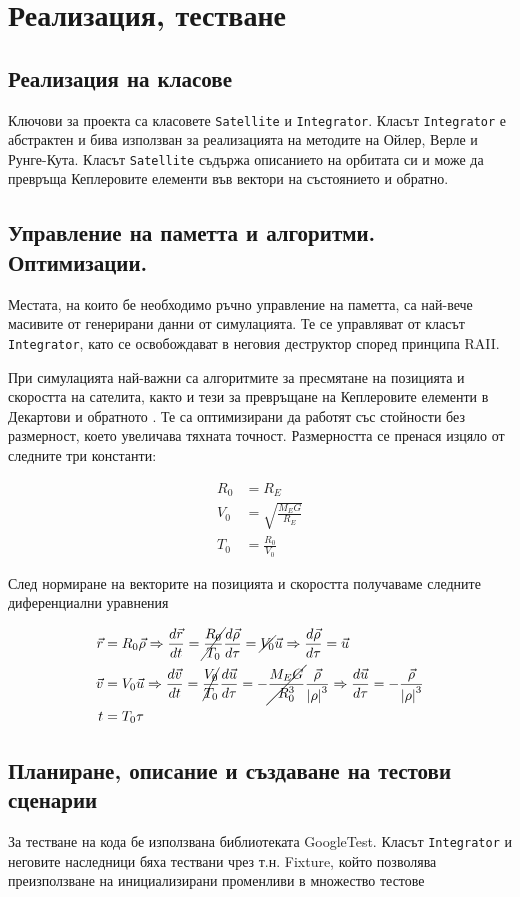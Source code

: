 \graphicspath{ {./chapter4/images/} }

\chapter{Реализация, тестване}


\section{Реализация на класове}

Ключови за проекта са класовете \texttt{Satellite} и \texttt{Integrator}. Класът
\texttt{Integrator} е абстрактен и бива използван за реализацията на методите на
Ойлер, Верле и Рунге-Кута. Класът \texttt{Satellite} съдържа описанието на
орбитата си и може да превръща Кеплеровите елементи във вектори на състоянието и
обратно.


\section{Управление на паметта и алгоритми. Оптимизации.}

Местата, на които бе необходимо ръчно управление на паметта, са най-вече
масивите от генерирани данни от симулацията. Те се управляват от класът
\texttt{Integrator}, като се освобождават в неговия деструктор според
принципа RAII.

При симулацията най-важни са алгоритмите за пресмятане на позицията и скоростта
на сателита, както и тези за превръщане на Кеплеровите елементи в Декартови и
обратното \cite{cart_to_kepl} \cite{kepl_to_cart} \cite{classical_orb_elem}. Те
са оптимизирани да работят със стойности без размерност, което
увеличава тяхната точност. Размерността се пренася изцяло от следните три
константи:

\begin{align*}
	R_0 &= R_E \\
	V_0 &= \sqrt{\frac{M_E G}{R_E}} \\
	T_0 &= \frac{R_0}{V_0}
\end{align*}

След нормиране на векторите на позицията и скоростта получаваме следните
диференциални уравнения

\begin{align*}
	\vec{r} &= R_0 \vec{\rho} \Rightarrow \frac{d\vec{r}}{dt} = \cancel{\frac{R_0}{T_0}} \frac{d\vec{\rho}}{d\tau} = \cancel{V_0} \vec{u} \Rightarrow \frac{d\vec{\rho}}{d\tau} = \vec{u} \\
	\vec{v} &= V_0 \vec{u} \Rightarrow \frac{d\vec{v}}{dt} = \cancel{\frac{V_0}{T_0}} \frac{d\vec{u}}{d\tau} = - \cancel{\frac{M_E G}{R_0^3}} \frac{\vec{\rho}}{\left\lvert \rho \right\rvert^3 } \Rightarrow \frac{d\vec{u}}{d\tau} = -\frac{\vec{\rho}}{\left\lvert \rho \right\rvert^3 } \\
	t &= T_0 \tau
\end{align*}


\section{Планиране, описание и създаване на тестови сценарии}

За тестване на кода бе използвана библиотеката GoogleTest. Класът
\texttt{Integrator} и неговите наследници бяха тествани чрез т.н. Fixture,
който позволява преизползване на инициализирани променливи в множество тестове

